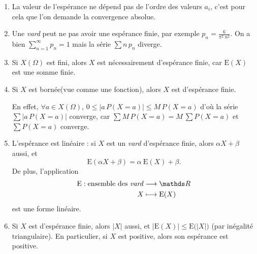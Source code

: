 \begin{rmk}
  \begin{enumerate}
    \item La valeur de l'espérance ne dépend pas de l'ordre des valeurs $a_i$, c'est pour cela que l'on demande la convergence absolue.
    \item Une \textit{vard} peut ne pas avoir une espérance finie, par exemple $p_n = \frac{6}{\pi^2\: n^2}$. On a bien $\sum_{n=1}^\infty p_n = 1$\/ mais la série $\sum n\,p_n$\/ diverge.
    \item Si $X(\Omega)$\/ est fini, alors $X$\/ est nécessairement d'espérance finie, car $\mathrm{E}(X)$\/ est une somme finie.
    \item Si $X$\/ est bornée\footnotemark (vue comme une fonction), alors $X$\/ est d'espérance finie.
      \begin{prv}
        En effet,
        $\forall a \in X(\Omega)$, $0 \le |a\,P(X= a)| \le M\, P(X=a)$\/
        d'où la série $\sum |a\, P(X = a)|$\/ converge, car $\sum M\,P(X=a) = M\: \sum P(X=a)$\/ et $\sum P(X = a)$\/ converge.
      \end{prv}
    \item L'espérance est linéaire : si $X$\/ est un \textit{vard} d'espérance finie, alors $\alpha X + \beta$\/ aussi, et \[
        \mathrm{E}(\alpha X + \beta) = \alpha\: \mathrm{E}(X) + \beta
      .\] De plus, l'application \begin{align*}
        \mathrm{E}: \text{ensemble des \textit{vard}} &\longrightarrow \R \\
        X &\longmapsto \mathrm{E}(X)
      \end{align*} est une forme linéaire.
    \item Si $X$\/ est d'espérance finie, alors $|X|$\/ aussi, et $\big|\mathrm{E}(X)\big| \le \mathrm{E}\big(|X|\big)$\/ (par inégalité triangulaire). En particulier, si $X$\/ est positive, alors son espérance est positive.
  \end{enumerate}
\end{rmk}

